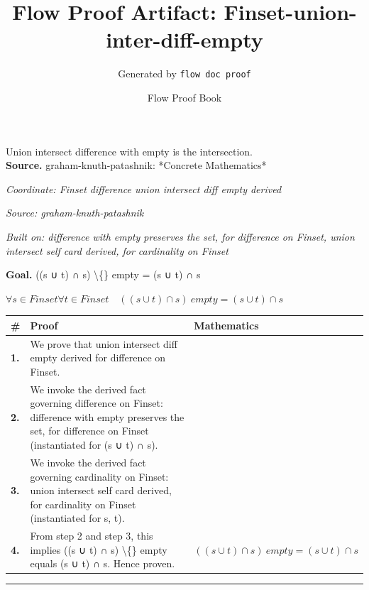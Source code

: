 \documentclass[11pt]{article}
\title{Flow Proof Artifact: Finset-union-inter-diff-empty}
\author{Generated by \texttt{flow doc proof}}
\date{Flow Proof Book}
\theoremstyle{definition}
\begin{document}
\maketitle
Union intersect difference with empty is the intersection.\\[0.5em]
\textbf{Source.} graham-knuth-patashnik: *Concrete Mathematics*\\[0.5em]
\bigskip
{}\par
\smallskip\noindent\textit{Coordinate: Finset \cdot difference \cdot union intersect diff empty derived}\par
\smallskip\noindent\textit{Source: graham-knuth-patashnik}\par
\smallskip\noindent\textit{Built on: difference with empty preserves the set, for difference on Finset, union intersect self card derived, for cardinality on Finset}\par
\medskip
\noindent\textbf{Goal.} ((s ∪ t) ∩ s) \textbackslash\{\} empty = (s ∪ t) ∩ s\par
\noindent$\displaystyle \forall s \in Finset \forall t \in Finset\quad ((s ∪ t) ∩ s) \ empty = (s ∪ t) ∩ s$\par
\medskip
\noindent
\begin{tabular}{@{} >{\raggedright\arraybackslash}p{} >{\raggedright\arraybackslash}p{} >{\raggedleft\arraybackslash}p{} @{}}
\textbf{\#} & \textbf{Proof} & \textbf{Mathematics} \\
\midrule
\textbf{1.} & We prove that union intersect diff empty derived for difference on Finset. & \\[0.45em]
\textbf{2.} & We invoke the derived fact governing difference on Finset: difference with empty preserves the set, for difference on Finset (instantiated for (s ∪ t) ∩ s). & \\[0.45em]
\textbf{3.} & We invoke the derived fact governing cardinality on Finset: union intersect self card derived, for cardinality on Finset (instantiated for s, t). & \\[0.45em]
\textbf{4.} & From step 2 and step 3, this implies ((s ∪ t) ∩ s) \textbackslash\{\} empty equals (s ∪ t) ∩ s. Hence proven. & $\displaystyle ((s ∪ t) ∩ s) \ empty = (s ∪ t) ∩ s$ \\[0.45em]
\bottomrule
\end{tabular}
\label{thm:Finset-difference-union_intersect_diff_empty_derived}
\par\medskip\hrule
\end{document}
